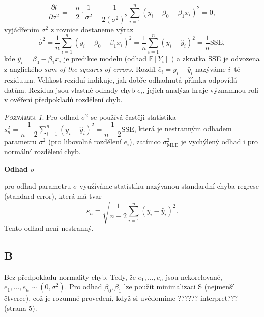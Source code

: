 \documentclass[oneside,intlimits,reqno]{scrbook}
\theoremstyle{definition}
\theoremstyle{plain}
\theoremstyle{remark}
\newtheorem{remark}[define]{\textsc{Poznámka}}
\begin{document}
\begin{equation}
\frac{ \partial l}{ \partial \sigma^{2}} = -\frac{n}{2} \cdot \dfrac{1}{\sigma^{2}} + \dfrac{1}{2 (\sigma^{2})^{2}} \sum_{i=1}^{n} ( y_{i} -  \beta_{0}  - \beta_{1} x_{i})^{2} = 0,
\end{equation}
vyjádřením $ \sigma^{2} $ z rovnice dostaneme výraz
\begin{equation}
\widehat{\sigma}^{2} = \frac{1}{n} \sum_{i=1}^{n} ( y_{i} -  \beta_{0}  - \beta_{1} x_{i})^{2} = \frac{1}{n} \sum_{i=1}^{n} ( y_{i} -  \widehat{y}_{i})^{2} = \dfrac{1}{n} \text{SSE},
\end{equation}
kde $ \widehat{y}_{i} = \beta_{0}  - \beta_{1} x_{i} $ je predikce modelu (odhad $ \mathbb{E} [ Y_{i} ] $ ) a  zkratka SSE je odvozena z anglického \textit{sum of the squares of errors}. Rozdíl $ \widehat{e}_{i} = y_{i} -  \widehat{y}_{i} $ nazýváme $ i $--té reziduum. Velikost reziduí indikuje, jak dobře odhadnutá přímka odpovídá datům. Rezidua jsou vlastně odhady chyb $ e_{i} $,  jejich analýza hraje významnou roli v ověření předpokladů rozdělení chyb.

\begin{remark}
Pro odhad $ \sigma^{2} $ se používá častěji statistika $ s^{2}_{n} = \dfrac{1}{n - 2} \sum_{i=1}^{n}(y_{i} -  \widehat{y}_{i})^{2} = \dfrac{1}{n-2} \text{SSE} $, která je nestranným odhadem parametru $ \sigma^{2} $ (pro libovolné rozdělení $ e_{i} $), zatímco $ \sigma^{2}_{\text{MLE}} $ je vychýlený odhad i pro normální rozdělení chyb.
\end{remark}
\textbf{Odhad $ \sigma $}

pro odhad parametru $ \sigma $ využíváme statistiku nazývanou standardní chyba regrese (standard error), která má tvar
\begin{equation}
 s_{n} = \sqrt{\dfrac{1}{n-2} \sum_{i=1}^{n}(y_{i} -  \widehat{y}_{i})^{2}}.
\end{equation}
Tento odhad není nestranný.

\subsection{B}
Bez předpokladu normality chyb. Tedy, že $ e_{1}, \dots , e_{n} $ jsou nekorelované, $ e_{1}, \dots , e_{n} \sim (0,\sigma^{2}) $.
Pro odhad $ \beta_{0}, \beta_{1} $ lze použít minimalizaci S (nejmenší čtverce), což je rozumné provedení, když si uvědomíme ?????? interpret??? (strana 5).
\end{document}
